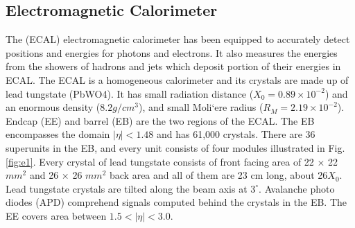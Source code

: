 \subsection{Electromagnetic Calorimeter}
The (ECAL) electromagnetic calorimeter has been equipped to accurately detect positions and energies for photons and electrons. It also measures the energies from the showers of hadrons and jets which deposit portion of their energies in ECAL. The ECAL is a homogeneous calorimeter and its crystals are made up of lead tungstate (PbWO4). It has small radiation distance ($X_0 = 0.89 \times 10^{-2}$) and an enormous density ($8.2 g/cm^3$), and small Moli`ere radius ($R_{M} = 2.19 \times 10^{-2}$). Endcap (EE) and barrel (EB)  are the two regions of the ECAL. The EB encompasses the domain $|\eta| < 1.48$ and has 61,000 crystals. There are 36 superunits in the EB, and every unit consists of four modules illustrated in Fig.\ref{fig:e1}. Every crystal of lead tungstate consists of front facing area of 22 × 22 $mm^2$ and 26 × 26 $mm^2$ back area and all of them are 23 cm long, about 26$X_0$. Lead tungstate crystals are tilted along the beam axis at $3^{\circ}$. Avalanche photo diodes (APD) comprehend signals computed behind the crystals in the EB. The EE covers area between $1.5 < |\eta| < 3.0$. \\
